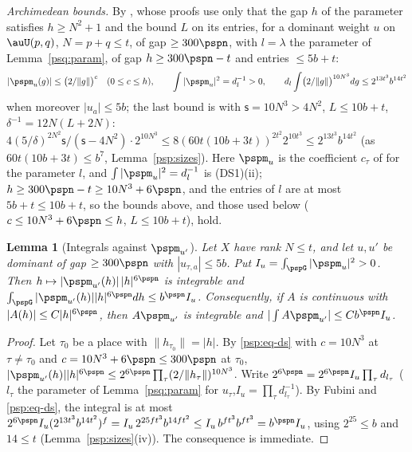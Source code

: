 \documentclass[10pt]{amsart}
\newtheorem{lemma}[theorem]{Lemma}
\theoremstyle{definition}
\theoremstyle{remark}
\begin{document}
\emph{Archimedean bounds.} By {\cite[\S\S5.2--5.6]{P51}}, whose proofs use only that the
gap $h$ of the parameter satisfies $h\ge N^2+1$ and the bound $L$ on its entries, for a dominant
weight $u$ on $\auU(p,q)$, $N=p+q\le t$, of gap $\ge300\pspn$, with $l=\lambda$ the parameter of
Lemma~\ref{psq:param}, of gap $h\ge300\pspn-t$ and entries $\le5b+t$:
\begin{equation}\label{psp:eq-ds}
|\pspm_u(g)|\le\bigl(2/\|g\|\bigr)^c\quad(0\le c\le h),\qquad
\int|\pspm_u|^2=d_l^{-1}>0,\qquad d_l\int\bigl(2/\|g\|\bigr)^{10N^3}dg\le2^{13t^3}b^{14t^2}
\end{equation}
when moreover $|u_a|\le5b$; the last bound is {\cite[Theorem~5.9]{P51}} with $\mathsf s=10N^3>4N^2$,
$L\le10b+t$, $\delta^{-1}=12N(L+2N)$: $4(5/\delta)^{2N^2}\mathsf s/(\mathsf s-4N^2)\cdot2^{10N^3}\le
8(60t(10b+3t))^{2t^2}2^{10t^3}\le2^{13t^3}b^{14t^2}$ (as $60t(10b+3t)\le b^7$, Lemma~\ref{psp:sizes}).
Here $\pspm_u$ is the coefficient $c_\tau$ of {\cite[\S5]{P51}} for the parameter $l$, and
$\int|\pspm_u|^2=d_l^{-1}$ is (DS1)(ii); $h\ge300\pspn-t\ge10N^3+6\pspn$, and the entries of $l$ are at most
$5b+t\le10b+t$, so the bounds above, and those used below ($c\le10N^3+6\pspn\le h$, $L\le10b+t$), hold.

\begin{lemma}[Integrals against $\pspm_{u'}$]\label{psp:int}
Let $X$ have rank $N\le t$, and let $u,u'$ be dominant of gap $\ge300\pspn$ with $|u_{\tau,a}|\le5b$.
Put $I_u=\int_{\pspG}|\pspm_u|^2>0$. Then $h\mapsto|\pspm_{u'}(h)|\,|h|^{6\pspn}$ is integrable and
$\int_{\pspG}|\pspm_{u'}(h)||h|^{6\pspn}dh\le b^{\pspn}I_u$. Consequently, if $A$ is continuous with
$|A(h)|\le C|h|^{6\pspn}$, then $A\pspm_{u'}$ is integrable and $|\int A\pspm_{u'}|\le Cb^{\pspn}I_u$.
\end{lemma}
\begin{proof}
Let $\tau_0$ be a place with $\|h_{\tau_0}\|=|h|$. By \eqref{psp:eq-ds} with $c=10N^3$ at $\tau\ne\tau_0$
and $c=10N^3+6\pspn\le300\pspn$ at $\tau_0$,
$|\pspm_{u'}(h)||h|^{6\pspn}\le2^{6\pspn}\prod_\tau(2/\|h_\tau\|)^{10N^3}$. Write
$2^{6\pspn}=2^{6\pspn}I_u\prod_\tau d_{l_\tau}$ ($l_\tau$ the parameter of Lemma~\ref{psq:param} for $u_\tau$,$I_u=\prod_\tau d_{l_\tau}^{-1}$).
By Fubini and \eqref{psp:eq-ds}, the integral is at most
$2^{6\pspn}I_u(2^{13t^3}b^{14t^2})^f=I_u\,2^{25ft^3}b^{14ft^2}\le I_u\,b^{ft^3}b^{ft^3}=b^{\pspn}I_u$,
using $2^{25}\le b$ and $14\le t$ (Lemma~\ref{psp:sizes}(iv)). The consequence is immediate.
\end{proof}
\end{document}
